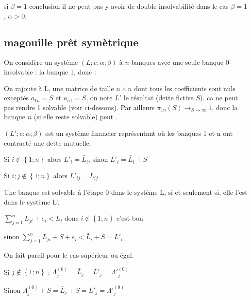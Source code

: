 \documentclass[11pt,oneside,twocolumn]{article}
\begin{document}
si $\beta=1$
conclusion il ne peut pas y avoir de double insolvabilité dans le cas $\beta=1$, $\alpha >0$.

\subsection{magouille prêt symètrique}
On considère un système $(L; e ; \alpha ; \beta)$ à $n$ banques avec une seule banque 0-insolvable : la banque 1, donc :


On rajoute à L, une matrice de taille $n\times n$  dont tous les coefficients sont nuls exceptés $a_{1n}=S$ et $a_{n1}=S$, on note $L'$ le résultat (dette fictive $S$). ca ne peut pas rendre 1 solvable (voir ci-dessous). Par ailleurs
$\pi_{1n}(S)\to_{S\to\infty} 1$,
donc la banque $n$ (si elle reste solvable)
peut .

$(L'; e ; \alpha ; \beta)$ est un système financier représentant où les banques 1 et n ont contracté une dette mutuelle.


Si $i \notin \left\lbrace 1; n \right\rbrace$ alors $\bar{L'}_{i} = \bar{L}_{i}$, sinon $\bar{L'}_{i} = \bar {L}_{i} + S$

Si $i;j \notin \left\lbrace 1; n \right\rbrace$ alors $L'_{ij} = L_{ij}$.


Une banque est solvable à l'étape 0 dans le système L, si et seulement si, elle l'est dans le système L'.


$\sum_{j=1}^{n} L_{ji} + e_{i} <  \bar{L}_{i}$ donc $i \notin \left\lbrace 1; n \right\rbrace$ c'est bon

sinon $\sum_{j=1}^{n} L_{ji} + S + e_{i} <  \bar{L}_{i} + S = \bar{L'}_{i}$

On fait pareil pour le cas supérieur ou égal.

\begin{center}
Si $j \notin \left\lbrace 1; n \right\rbrace$ : $\Lambda^{(0)}_{j} = \bar{L}_{j} = \bar{L'}_{j} = \Lambda'^{(0)}_{j} $

Sinon $\Lambda^{(0)}_{j} + S = \bar{L}_{j} + S = \bar{L'}_{j} = \Lambda'^{(0)}_{j} $
\end{center}
\end{document}
